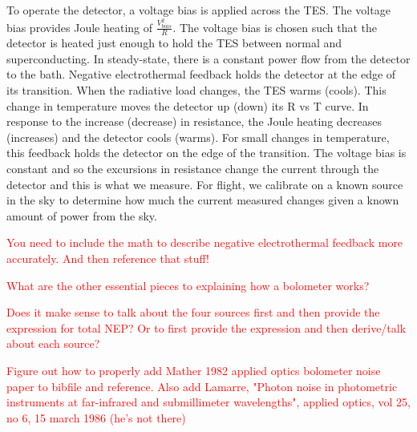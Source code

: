 
To operate the detector, a voltage bias is applied across the \ac{TES}. 
The voltage bias provides Joule heating of $\frac{V^{2}_{bias}}{R}$.
The voltage bias is chosen such that the detector is heated just enough to hold the \ac{TES} between normal and superconducting. 
In steady-state, there is a constant power flow from the detector to the bath. 
Negative electrothermal feedback holds the detector at the edge of its transition. 
When the radiative load changes, the \ac{TES} warms (cools). 
This change in temperature moves the detector up (down) its R vs T curve. 
In response to the increase (decrease) in resistance, the Joule heating decreases (increases) and the detector cools (warms). 
For small changes in temperature, this feedback holds the detector on the edge of the transition. 
The voltage bias is constant and so the excursions in resistance change the current through the detector and this is what we measure. 
For flight, we calibrate on a known source in the sky to determine how much the current measured changes given a known amount of power from the sky.   

\textcolor{red}{You need to include the math to describe negative electrothermal feedback more accurately. And then reference that stuff!}

\textcolor{red}{What are the other essential pieces to explaining how a bolometer works?}

\textcolor{red}{Does it make sense to talk about the four sources first and then provide the expression for total NEP? Or to first provide the expression and then derive/talk about each source?}

\textcolor{red}{Figure out how to properly add Mather 1982 applied optics bolometer noise paper to bibfile and reference. Also add Lamarre, "Photon noise in photometric instruments at far-infrared and submillimeter wavelengths", applied optics, vol 25, no 6, 15 march 1986 (he's not there)}


